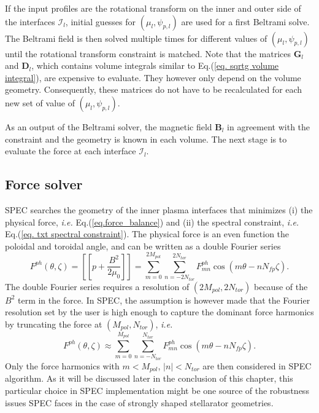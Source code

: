 \documentclass[my_thesis.tex]{subfiles}
\begin{document}
If the input profiles are the rotational transform on the inner and outer side of the interfaces $\mathcal{I}_l$, initial guesses for $(\mu_l,\psi_{p,l})$ are used for a first Beltrami solve. The Beltrami field is then solved multiple times for different values of $(\mu_l,\psi_{p,l})$ until the rotational transform constraint is matched. Note that the matrices $\mathbf{G}_l$ and $\mathbf{D}_l$, which contains volume integrals similar to Eq.(\ref{eq. sqrtg volume integral}), are expensive to evaluate. They however only depend on the volume geometry. Consequently, these matrices do not have to be recalculated for each new set of value of $(\mu_l,\psi_{p,l})$.

As an output of the Beltrami solver, the magnetic field $\mathbf{B}_l$ in agreement with the constraint and the geometry is known in each volume. The next stage is to evaluate the force at each interface $\mathcal{I}_l$.



\subsection{Force solver}
SPEC searches the geometry of the inner plasma interfaces that minimizes (i) the physical force, \textit{i.e.} Eq.(\ref{eq.force_balance}) and (ii) the spectral constraint, \textit{i.e.} Eq.(\ref{eq. txt spectral constraint}). The physical force is an even function the poloidal and toroidal angle, and can be written as a double Fourier series 
\begin{equation}
	F^{ph}(\theta,\zeta) = \left[\left[ p + \frac{B^2}{2\mu_0}\right]\right] = \sum_{m=0}^{2M_{pol}}\sum_{n=-2N_{tor}}^{2N_{tor}} F^{ph}_{mn}\cos(m\theta-nN_{fp}\zeta).
\end{equation}
The double Fourier series requires a resolution of $(2M_{pol},2N_{tor})$ because of the $B^2$ term in the force. In SPEC, the assumption is however made that the Fourier resolution set by the user is high enough to capture the dominant force harmonics by truncating the force at $(M_{pol},N_{tor})$, \textit{i.e.}
\begin{equation}
	F^{ph}(\theta,\zeta) \approx \sum_{m=0}^{M_{pol}}\sum_{n=-N_{tor}}^{N_{tor}} F^{ph}_{mn}\cos(m\theta-nN_{fp}\zeta).
\end{equation}
Only the force harmonics with $m<M_{pol}$, $|n|<N_{tor}$ are then considered in SPEC algorithm. As it will be discussed later in the conclusion of this chapter, this particular choice in SPEC implementation might be one source of the robustness issues SPEC faces in the case of strongly shaped stellarator geometries.
\end{document}
